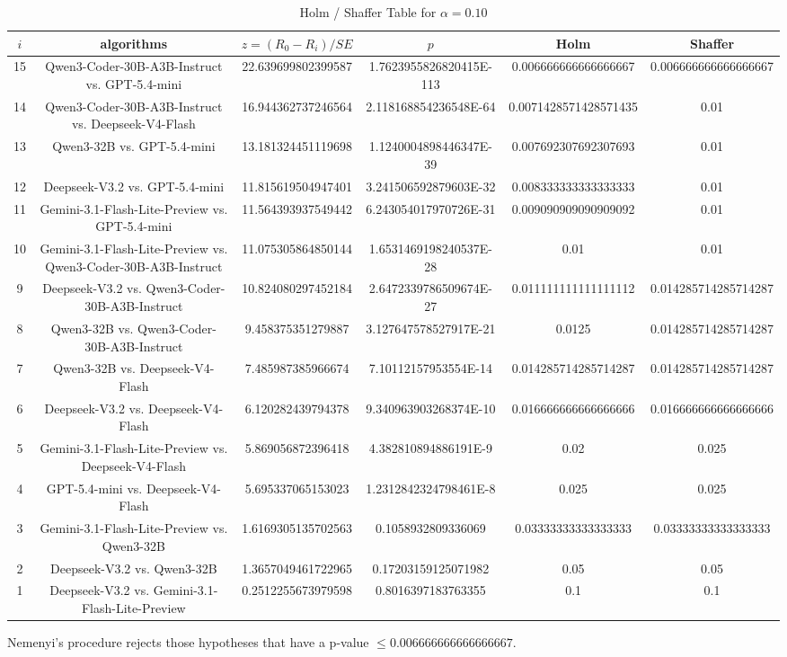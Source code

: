 \documentclass[a4paper,10pt]{article}
\begin{document}
\begin{landscape}
\begin{table}[!htp]
\centering\tiny
\caption{Holm / Shaffer Table for $\alpha=0.10$}
\begin{tabular}{cccccc}
$i$&algorithms&$z=(R_0 - R_i)/SE$&$p$&Holm&Shaffer\\
\hline
15&Qwen3-Coder-30B-A3B-Instruct vs. GPT-5.4-mini&22.639699802399587&1.7623955826820415E-113&0.006666666666666667&0.006666666666666667\\14&Qwen3-Coder-30B-A3B-Instruct vs. Deepseek-V4-Flash&16.944362737246564&2.118168854236548E-64&0.0071428571428571435&0.01\\13&Qwen3-32B vs. GPT-5.4-mini&13.181324451119698&1.1240004898446347E-39&0.007692307692307693&0.01\\12&Deepseek-V3.2 vs. GPT-5.4-mini&11.815619504947401&3.241506592879603E-32&0.008333333333333333&0.01\\11&Gemini-3.1-Flash-Lite-Preview vs. GPT-5.4-mini&11.564393937549442&6.243054017970726E-31&0.009090909090909092&0.01\\10&Gemini-3.1-Flash-Lite-Preview vs. Qwen3-Coder-30B-A3B-Instruct&11.075305864850144&1.6531469198240537E-28&0.01&0.01\\9&Deepseek-V3.2 vs. Qwen3-Coder-30B-A3B-Instruct&10.824080297452184&2.6472339786509674E-27&0.011111111111111112&0.014285714285714287\\8&Qwen3-32B vs. Qwen3-Coder-30B-A3B-Instruct&9.458375351279887&3.127647578527917E-21&0.0125&0.014285714285714287\\7&Qwen3-32B vs. Deepseek-V4-Flash&7.485987385966674&7.10112157953554E-14&0.014285714285714287&0.014285714285714287\\6&Deepseek-V3.2 vs. Deepseek-V4-Flash&6.120282439794378&9.340963903268374E-10&0.016666666666666666&0.016666666666666666\\5&Gemini-3.1-Flash-Lite-Preview vs. Deepseek-V4-Flash&5.869056872396418&4.382810894886191E-9&0.02&0.025\\4&GPT-5.4-mini vs. Deepseek-V4-Flash&5.695337065153023&1.2312842324798461E-8&0.025&0.025\\3&Gemini-3.1-Flash-Lite-Preview vs. Qwen3-32B&1.6169305135702563&0.1058932809336069&0.03333333333333333&0.03333333333333333\\2&Deepseek-V3.2 vs. Qwen3-32B&1.3657049461722965&0.17203159125071982&0.05&0.05\\1&Deepseek-V3.2 vs. Gemini-3.1-Flash-Lite-Preview&0.2512255673979598&0.8016397183763355&0.1&0.1\\\hline
\end{tabular}
\end{table}
Nemenyi's procedure rejects those hypotheses that have a p-value $\le0.006666666666666667$.



\end{landscape}
\end{document}
